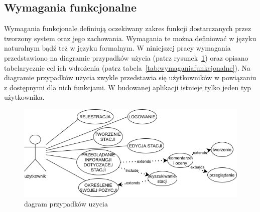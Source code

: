 \subsection{Wymagania funkcjonalne}
Wymagania funkcjonale definiują oczekiwany zakres funkcji dostarczanych przez tworzony system oraz jego zachowania. Wymagania te można definiować w języku naturalnym bądź też w języku formalnym. W niniejszej pracy wymagania przedstawiono na diagramie przypadków użycia (patrz rysunek~\ref{fig:usecasediagram}) oraz opisano tabelarycznie cel ich wdrożenia (patrz tabela~\ref{tab:wymaganiafunkcjonalne}).
Na diagramie przypadków użycia zwykle przedstawia się użytkowników w powiązaniu z dostępnymi dla nich funkcjami. W budowanej aplikacji istnieje tylko jeden typ użytkownika. 
\begin{figure}[ht]
    \centering
        \includegraphics[width=0.7\linewidth]{rys02/use_case_diagram1.png}
        \caption{dagram przypadków uzycia}
    \label{fig:usecasediagram}
\end{figure}

